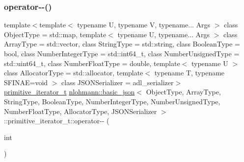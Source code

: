 \subsubsection{\texorpdfstring{operator-\/-\/()}{operator--()}\hspace{0.1cm}{\footnotesize\ttfamily [2/2]}}
{\footnotesize\ttfamily template$<$template$<$ typename U, typename V, typename... Args $>$ class Object\+Type = std\+::map, template$<$ typename U, typename... Args $>$ class Array\+Type = std\+::vector, class String\+Type  = std\+::string, class Boolean\+Type  = bool, class Number\+Integer\+Type  = std\+::int64\+\_\+t, class Number\+Unsigned\+Type  = std\+::uint64\+\_\+t, class Number\+Float\+Type  = double, template$<$ typename U $>$ class Allocator\+Type = std\+::allocator, template$<$ typename T, typename S\+F\+I\+N\+A\+E=void $>$ class J\+S\+O\+N\+Serializer = adl\+\_\+serializer$>$ \\
\hyperlink{classnlohmann_1_1basic__json_1_1primitive__iterator__t}{primitive\+\_\+iterator\+\_\+t} \hyperlink{classnlohmann_1_1basic__json}{nlohmann\+::basic\+\_\+json}$<$ Object\+Type, Array\+Type, String\+Type, Boolean\+Type, Number\+Integer\+Type, Number\+Unsigned\+Type, Number\+Float\+Type, Allocator\+Type, J\+S\+O\+N\+Serializer $>$\+::primitive\+\_\+iterator\+\_\+t\+::operator-\/-\/ (\begin{DoxyParamCaption}\item[{int}]{ }\end{DoxyParamCaption})\hspace{0.3cm}{\ttfamily [inline]}}

\mbox{\label{classnlohmann_1_1basic__json_1_1primitive__iterator__t_a602e4a8601791b3a436db37cc2531c22}} 
